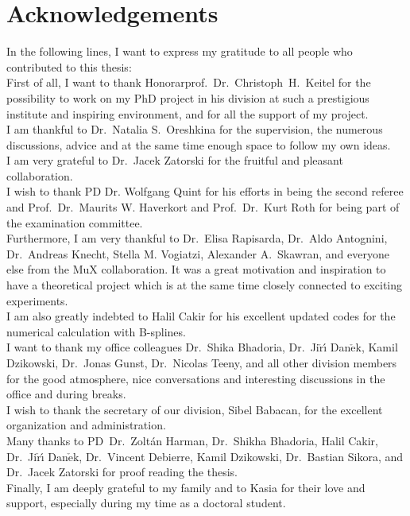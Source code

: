 \chapter*{Acknowledgements}

In the following lines, I want to express my gratitude to all people who contributed to this thesis:\\
First of all, I want to thank Honorarprof.~Dr.~Christoph~H.~Keitel for the possibility to work on my PhD project in his division at such a prestigious institute and inspiring environment, and for all the support of my project. \\
I am thankful to Dr.~Natalia S.~Oreshkina for the supervision, the numerous discussions, advice and at the same time enough space to follow my own ideas.\\
I am very grateful to Dr.~Jacek Zatorski for the fruitful and pleasant collaboration.\\
I wish to thank PD Dr. Wolfgang Quint for his efforts in being the second referee and Prof.~Dr.~Maurits W. Haverkort and Prof.~Dr.~Kurt Roth for being part of the examination committee.\\
Furthermore, I am very thankful to Dr.~Elisa Rapisarda, Dr.~Aldo Antognini, Dr.~Andreas Knecht, Stella M. Vogiatzi, Alexander A.~Skawran, and everyone else from the MuX collaboration. It was a great motivation and inspiration to have a theoretical project which is at the same time closely connected to exciting experiments.\\
I am also greatly indebted to Halil Cakir for his excellent updated codes for the numerical calculation with B-splines.\\
I want to thank my  office colleagues Dr.~Shika Bhadoria, Dr.~Ji$\check{\text{r}}${\'\i} Dan$\check{\text{e}}$k, Kamil Dzikowski, Dr.~Jonas Gunst, Dr.~Nicolas Teeny, and all other division members for the good atmosphere, nice conversations and interesting discussions in the office and during breaks.\\
I wish to thank the secretary of our division, Sibel Babacan, for the excellent organization and administration.\\
Many thanks to PD~Dr.~Zoltán Harman, Dr.~Shikha Bhadoria,  Halil Cakir, Dr.~Ji$\check{\text{r}}${\'\i} Dan$\check{\text{e}}$k, Dr.~Vincent Debierre, Kamil Dzikowski, Dr.~Bastian Sikora, and Dr.~Jacek Zatorski for proof reading the thesis.\\%
Finally, I am deeply grateful to my family and to Kasia for their love and support, especially during my time as a doctoral student.
%



